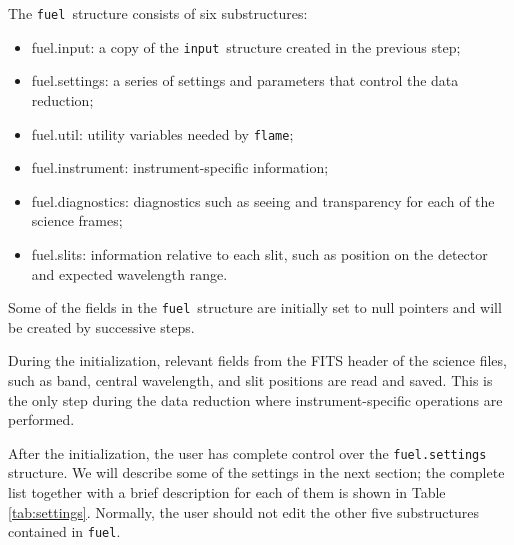 \documentclass[a4paper]{article}
\newcommand{\flame}{\texttt{flame}}
\newcommand{\fuel}{\texttt{fuel}}
\newcommand{\inp}{\texttt{input}}
\begin{document}
The \fuel\ structure consists of six substructures:
\begin{itemize}
	\item fuel.input: a copy of the \inp\ structure created in the previous step;
  \item fuel.settings: a series of settings and parameters that control the data reduction;
	\item fuel.util: utility variables needed by \flame;
	\item fuel.instrument: instrument-specific information;
	\item fuel.diagnostics: diagnostics such as seeing and transparency for each of the science frames;
	\item fuel.slits: information relative to each slit, such as position on the detector and expected wavelength range.
\end{itemize}

Some of the fields in the \fuel\ structure are initially set to null pointers and will be created by successive steps.

During the initialization, relevant fields from the FITS header of the science files, such as band, central wavelength, and slit positions are read and saved. This is the only step during the data reduction where instrument-specific operations are performed.

After the initialization, the user has complete control over the \texttt{fuel.settings} structure. We will describe some of the settings in the next section; the complete list together with a brief description for each of them is shown in Table \ref{tab:settings}. Normally, the user should not edit the other five substructures contained in \fuel.
\end{document}
